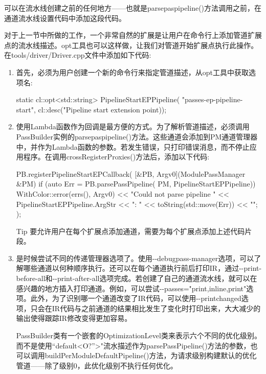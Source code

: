 可以在流水线创建之前的任何地方——也就是parsepaspipeline()方法调用之前，在通道流水线设置代码中添加这段代码。

对于上一节中所做的工作，一个非常自然的扩展是让用户在命令行上添加管道扩展点的流水线描述。opt工具也可以这样做，让我们对管道开始扩展点执行此操作。在tools/driver/Driver.cpp文件中添加如下代码:

\begin{enumerate}
\item
首先，必须为用户创建一个新的命令行来指定管道描述，从opt工具中获取选项名:

\begin{cpp}
static cl::opt<std::string> PipelineStartEPPipeline(
    "passes-ep-pipeline-start",
    cl::desc("Pipeline start extension point));
\end{cpp}

\item
使用Lambda函数作为回调是最方便的方式。为了解析管道描述，必须调用PassBuilder实例的parsepaspipeline()方法。这些通道会添加到PM通道管理器中，并作为Lambda函数的参数。若发生错误，只打印错误消息，而不停止应用程序。在调用crossRegisterProxies()方法后，添加以下代码:

\begin{cpp}
PB.registerPipelineStartEPCallback(
[&PB, Argv0](ModulePassManager &PM) {
    if (auto Err = PB.parsePassPipeline(
            PM, PipelineStartEPPipeline)) {
        WithColor::error(errs(), Argv0)
            << "Could not parse pipeline "
            << PipelineStartEPPipeline.ArgStr << ": "
            << toString(std::move(Err)) << "\n";
    }
});
\end{cpp}

\begin{myTip}{Tip}
要允许用户在每个扩展点添加通道，需要为每个扩展点添加上述代码片段。
\end{myTip}

\item
是时候尝试不同的传递管理器选项了。使用-{}-debugpass-manager选项，可以了解哪些通道以何种顺序执行。还可以在每个通道执行前后打印IR，通过-{}-print-before-all和-{}-print-after-all选项完成。若创建了自己的通道流水线，就可以在感兴趣的地方插入打印通道。例如，可以尝试-{}-passes="print,inline,print"选项。此外，为了识别哪一个通道改变了IR代码，可以使用-{}-printchanged选项，只会在IR代码与之前通道的结果相比发生了变化时打印出来，大大减少的输出使得跟踪IR修改变得更加容易。

PassBuilder类有一个嵌套的OptimizationLevel类来表示六个不同的优化级别。而不是使用“default<O?”>"流水描述作为parsePassPipeline()方法的参数，也可以调用buildPerModuleDefaultPipeline()方法，为请求级别构建默认的优化管道——除了级别0，此优化级别不执行任何优化。


\end{enumerate}
